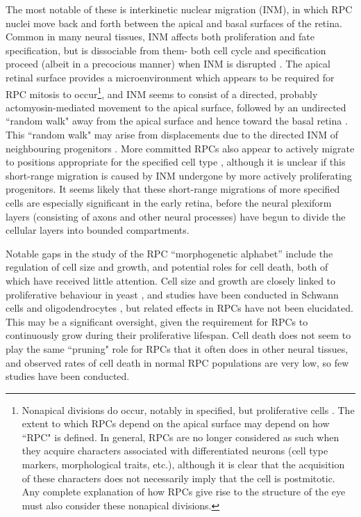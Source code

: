 The most notable of these is interkinetic nuclear migration (INM), in which RPC nuclei move back and forth between the apical and basal surfaces of the retina. Common in many neural tissues, INM affects both proliferation and fate specification, but is dissociable from them- both cell cycle and specification proceed (albeit in a precocious manner) when INM is disrupted \cite{Murciano2002}. The apical retinal surface provides a microenvironment which appears to be required for RPC mitosis to occur\footnote{Nonapical divisions do occur, notably in specified, but proliferative cells \cite{Godinho2007}. The extent to which RPCs depend on the apical surface may depend on how ``RPC" is defined. In general, RPCs are no longer considered as such when they acquire characters associated with differentiated neurons (cell type markers, morphological traits, etc.), although it is clear that the acquisition of these characters does not necessarily imply that the cell is postmitotic. Any complete explanation of how RPCs give rise to the structure of the eye must also consider these nonapical divisions.}, and INM seems to consist of a directed, probably actomyosin-mediated movement to the apical surface, followed by an undirected ``random walk" away from the apical surface and hence toward the basal retina \cite{Norden2009}. This ``random walk" may arise from displacements due to the directed INM of neighbouring progenitors \cite{Azizi2020}. More committed RPCs also appear to actively migrate to positions appropriate for the specified cell type \cite{Chow2015,Icha2016}, although it is unclear if this short-range migration is caused by INM undergone by more actively proliferating progenitors. It seems likely that these short-range migrations of more specified cells are especially significant in the early retina, before the neural plexiform layers (consisting of axons and other neural processes) have begun to divide the cellular layers into bounded compartments.

Notable gaps in the study of the RPC ``morphogenetic alphabet'' include the regulation of cell size and growth, and potential roles for cell death, both of which have received little attention.  Cell size and growth are closely linked to proliferative behaviour in yeast \cite{Yang2011}, and studies have been conducted in Schwann cells and oligodendrocytes \cite{Conlon2001}, but related effects in RPCs have not been elucidated. This may be a significant oversight, given the requirement for RPCs to continuously grow during their proliferative lifespan. Cell death does not seem to play the same ``pruning" role for RPCs that it often does in other neural tissues, and observed rates of cell death in normal RPC populations are very low, so few studies have been conducted.

